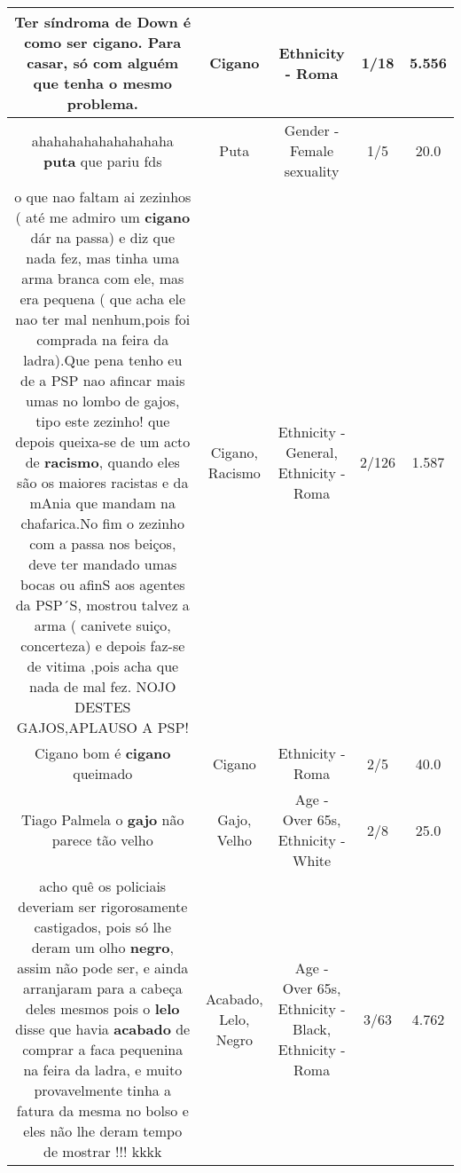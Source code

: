 \documentclass[11pt]{article}
\newlength\mylength
\begin{document}
\begin{center}
\begin{longtable}{|C{.65\mylength}|C{.30\mylength}|C{.12\mylength}|C{.12\mylength}|C{.12\mylength}|}
  \small Ter síndroma de Down é como ser \textbf{cigano}. Para casar, só com alguém que tenha o mesmo problema.\normalsize   & Cigano & Ethnicity - Roma & 1/18 & 5.556 \\  \hline
  \small ahahahahahahahahaha \textbf{puta} que pariu fds\normalsize   & Puta & Gender - Female sexuality & 1/5 & 20.0 \\  \hline
  \small o que nao faltam ai zezinhos ( até me admiro um \textbf{cigano} dár na passa) e diz que nada fez, mas tinha uma arma branca com ele, mas era pequena ( que acha ele nao ter mal nenhum,pois foi comprada na feira da ladra).Que pena tenho eu de a PSP nao afincar mais umas no lombo de gajos, tipo este zezinho! que depois queixa-se de um acto de \textbf{racismo}, quando eles são os maiores racistas e da mAnia que mandam na chafarica.No fim o zezinho com a passa nos beiços, deve ter mandado umas bocas ou afinS aos agentes da PSP´S, mostrou talvez a arma ( canivete suiço, concerteza) e depois faz-se de vitima ,pois acha que nada de mal fez. NOJO DESTES GAJOS,APLAUSO A PSP!\normalsize   & Cigano, Racismo & Ethnicity - General, Ethnicity - Roma & 2/126 & 1.587 \\  \hline
  \small Cigano bom é \textbf{cigano} queimado\normalsize   & Cigano & Ethnicity - Roma & 2/5 & 40.0 \\  \hline
  \small Tiago Palmela o \textbf{gajo} não parece tão velho\normalsize   & Gajo, Velho & Age - Over 65s, Ethnicity - White & 2/8 & 25.0 \\  \hline
  \small acho quê os policiais deveriam ser rigorosamente castigados, pois só lhe deram um olho \textbf{negro}, assim não pode ser, e ainda arranjaram para a cabeça deles mesmos pois o \textbf{lelo} disse que havia \textbf{acabado} de comprar a faca pequenina na feira da ladra, e muito provavelmente tinha a fatura da mesma no bolso e eles não lhe deram tempo de mostrar !!! kkkk\normalsize   & Acabado, Lelo, Negro & Age - Over 65s, Ethnicity - Black, Ethnicity - Roma & 3/63 & 4.762 \\  \hline

\end{longtable}
\end{center}
\end{document}
